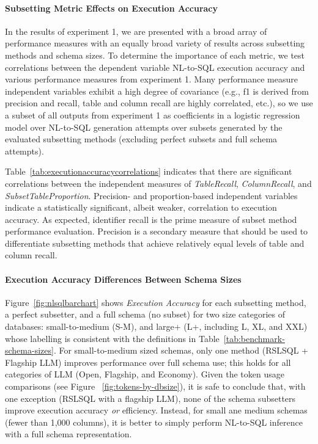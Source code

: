 \paragraph{\textbf{Subsetting Metric Effects on Execution Accuracy}}
In the results of experiment 1, we are presented with a broad array of performance measures with an equally broad variety of results across subsetting methods and schema sizes.
To determine the importance of each metric, we test correlations between the dependent variable NL-to-SQL execution accuracy and various performance measures from experiment 1.
Many performance measure independent variables exhibit a high degree of covariance (e.g., f1 is derived from precision and recall, table and column recall are highly correlated, etc.), so we use a subset of all outputs from experiment 1 as coefficients in a logistic regression model over NL-to-SQL generation attempts over subsets generated by the evaluated subsetting methods (excluding perfect subsets and full schema attempts).


Table~\ref{tab:executionaccuracycorrelations} indicates that there are significant correlations between the independent measures of \emph{TableRecall}, \emph{ColumnRecall}, and \emph{SubsetTableProportion}. 
Precision- and proportion-based independent variables indicate a statistically significant, albeit weaker, correlation to execution accuracy.
As expected, identifier recall is the prime measure of subset method performance evaluation. 
Precision is a secondary measure that should be used to differentiate subsetting methods that achieve relatively equal levels of table and column recall. 

\paragraph{\textbf{Execution Accuracy Differences Between Schema Sizes}}

Figure~\ref{fig:nlsqlbarchart} shows \emph{Execution Accuracy} for each subsetting method, a perfect subsetter, and a full schema (no subset) for two size categories of databases: small-to-medium (S-M), and large+ (L+, including L, XL, and XXL) whose labelling is consistent with the definitions in Table~\ref{tab:benchmark-schema-sizes}.
For small-to-medium sized schemas, only one method (RSLSQL + Flagship LLM) improves performance over full schema use; this holds for all categories of LLM (Open, Flagship, and Economy). 
Given the token usage comparisons (see Figure ~\ref{fig:tokens-by-dbsize}), it is safe to conclude that, with one exception (RSLSQL with a flagship LLM), none of the schema subsetters improve execution accuracy \emph{or} efficiency.
Instead, for small ane medium schemas (fewer than 1,000 columns), it is better to simply perform NL-to-SQL inference with a full schema representation.

